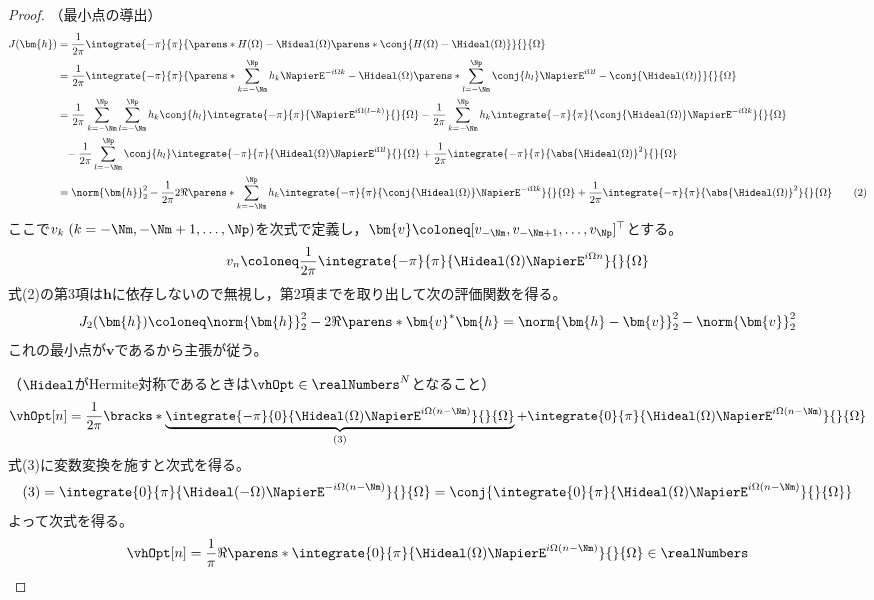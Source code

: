             \begin{proof}
                （最小点の導出）
                \begin{align*}
                    J(\bm{h}) &= \frac{1}{2\pi}\integrate{-\pi}{\pi}{\parens*{H(\Omega)-\Hideal(\Omega)}\parens*{\conj{H(\Omega)-\Hideal(\Omega)}}}{}{\Omega} \\
                    &= \frac{1}{2\pi}\integrate{-\pi}{\pi}{\parens*{\sum_{k=-\Nm}^\Np h_k\NapierE^{-i\Omega k} -\Hideal(\Omega)}\parens*{\sum_{l=-\Nm}^\Np \conj{h_l}\NapierE^{i\Omega l} -\conj{\Hideal(\Omega)}}}{}{\Omega} \\
                    &= \frac{1}{2\pi}\sum_{k=-\Nm}^\Np\sum_{l=-\Nm}^\Np h_k\conj{h_l}\integrate{-\pi}{\pi}{\NapierE^{i\Omega(l-k)}}{}{\Omega} - \frac{1}{2\pi}\sum_{k=-\Nm}^\Np h_k\integrate{-\pi}{\pi}{\conj{\Hideal(\Omega)}\NapierE^{-i\Omega k}}{}{\Omega} \\
                    &\phantom{=}- \frac{1}{2\pi}\sum_{l=-\Nm}^\Np \conj{h_l}\integrate{-\pi}{\pi}{\Hideal(\Omega)\NapierE^{i\Omega l}}{}{\Omega} + \frac{1}{2\pi}\integrate{-\pi}{\pi}{\abs{\Hideal(\Omega)}^2}{}{\Omega} \\
                    &= \norm{\bm{h}}_2^2 - \frac{1}{2\pi}2\Re\parens*{\sum_{k=-\Nm}^\Np h_k\integrate{-\pi}{\pi}{\conj{\Hideal(\Omega)}\NapierE^{-i\Omega k}}{}{\Omega}} + \frac{1}{2\pi}\integrate{-\pi}{\pi}{\abs{\Hideal(\Omega)}^2}{}{\Omega} \tag{2}
                \end{align*}
                ここで$v_k\;(k=-\Nm,-\Nm+1,\dots,\Np)$を次式で定義し，$\bm{v}\coloneq[v_{-\Nm},v_{-\Nm+1},\dots,v_\Np]^\top$とする。
                \[ v_n \coloneq \frac{1}{2\pi}\integrate{-\pi}{\pi}{\Hideal(\Omega)\NapierE^{i\Omega n}}{}{\Omega} \]
                式(2)の第3項は$\bm{h}$に依存しないので無視し，第2項までを取り出して次の評価関数を得る。
                \[ J_2(\bm{h}) \coloneq \norm{\bm{h}}_2^2 - 2\Re\parens*{\bm{v}^*\bm{h}} = \norm{\bm{h} - \bm{v}}_2^2 - \norm{\bm{v}}_2^2 \]
                これの最小点が$\bm{v}$であるから主張が従う。
                \newline
                \par\noindent
                （$\Hideal$がHermite対称であるときは$\vhOpt\in\realNumbers^N$となること）
                \[ \vhOpt[n] = \frac{1}{2\pi}\bracks*{\underbrace{\integrate{-\pi}{0}{\Hideal(\Omega)\NapierE^{i\Omega (n-\Nm)}}{}{\Omega}}_{(3)} + \integrate{0}{\pi}{\Hideal(\Omega)\NapierE^{i\Omega (n-\Nm)}}{}{\Omega}} \]
                式(3)に変数変換を施すと次式を得る。
                \[ (3) = \integrate{0}{\pi}{\Hideal(-\Omega)\NapierE^{-i\Omega (n-\Nm)}}{}{\Omega} = \conj{\integrate{0}{\pi}{\Hideal(\Omega)\NapierE^{i\Omega (n-\Nm)}}{}{\Omega}} \]
                よって次式を得る。
                \[ \vhOpt[n] = \frac{1}{\pi}\Re\parens*{\integrate{0}{\pi}{\Hideal(\Omega)\NapierE^{i\Omega (n-\Nm)}}{}{\Omega}}\in\realNumbers \]
            \end{proof}
